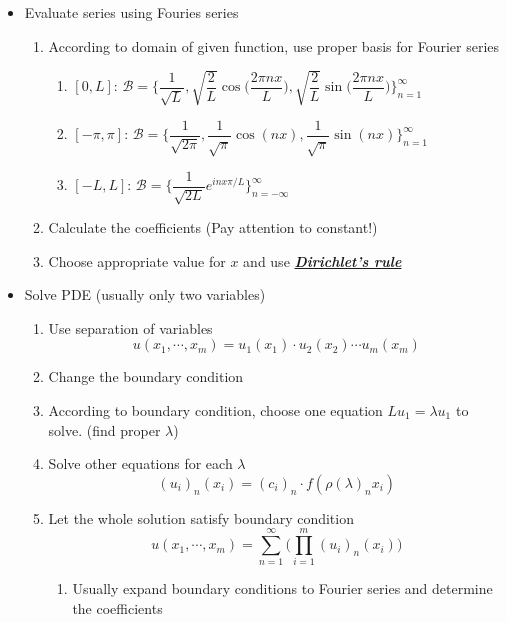 \documentclass{beamer}
\begin{document}
\begin{frame}
\begin{itemize}
\item Evaluate series using Fouries series
\begin{enumerate}
\item According to domain of given function, use proper basis for Fourier series
\begin{enumerate}
\item $[0,L]$: $\mathcal{B}=\Big\lbrace \dfrac{1}{\sqrt{L}},\sqrt{\dfrac{2}{L}}\cos\Big(\dfrac{2\pi nx}{L}\Big),\sqrt{\dfrac{2}{L}}\sin\Big(\dfrac{2\pi nx}{L}\Big)\Big\rbrace_{n=1}^{\infty}$
\item $[-\pi,\pi]$: $\mathcal{B}=\Big\lbrace \dfrac{1}{\sqrt{2\pi}},\dfrac{1}{\sqrt{\pi}}\cos(nx),\dfrac{1}{\sqrt{\pi}}\sin(nx)\Big\rbrace_{n=1}^{\infty}$
\item $[-L,L]$: $\mathcal{B}=\Big\lbrace \dfrac{1}{\sqrt{2L}}e^{inx\pi/L}\Big\rbrace_{n=-\infty}^{\infty}$
\end{enumerate}
\item Calculate the coefficients (Pay attention to constant!)
\item Choose appropriate value for $x$ and use \underline{\textbf{\textit{\emph{Dirichlet's rule}}}} 
\end{enumerate}
\end{itemize}
\end{frame}

\begin{frame}
\begin{itemize}
\item Solve PDE (usually only two variables)

\begin{enumerate}
\item Use separation of variables
$$u(x_1,\cdots, x_m) = u_1(x_1) \cdot u_2(x_2) \cdots u_m(x_m)$$

\item Change the boundary condition
\item  According to boundary condition, choose one equation $L u_1=\lambda u_1$ to solve. (find proper $\lambda$)
\item Solve other equations for each $\lambda$
$$(u_i)_n(x_i)=(c_i)_n\cdot f(\rho(\lambda)_nx_i)$$
\item Let the whole solution satisfy boundary condition 
$$u(x_1,\cdots,x_m)=\sum\limits_{n=1}^{\infty}\Big(\prod\limits_{i=1}^m(u_i)_n(x_i)\Big)$$
\begin{enumerate}
\item Usually expand boundary conditions to Fourier series and determine the coefficients
\end{enumerate}
\end{enumerate}
\end{itemize}
\end{frame}
\end{document}
